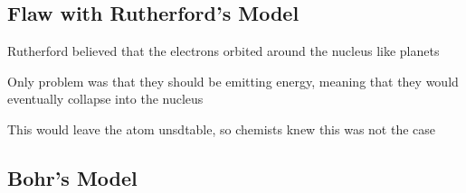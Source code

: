 \subsection{Flaw with Rutherford's Model}
\begin{bulleted-list}
    \item Rutherford believed that the electrons orbited around the nucleus like planets
    \item Only problem was that they should be emitting energy, meaning that they would eventually
        collapse into the nucleus
    \item This would leave the atom unsdtable, so chemists knew this was not the case
\end{bulleted-list}

\subsection{Bohr's Model}
